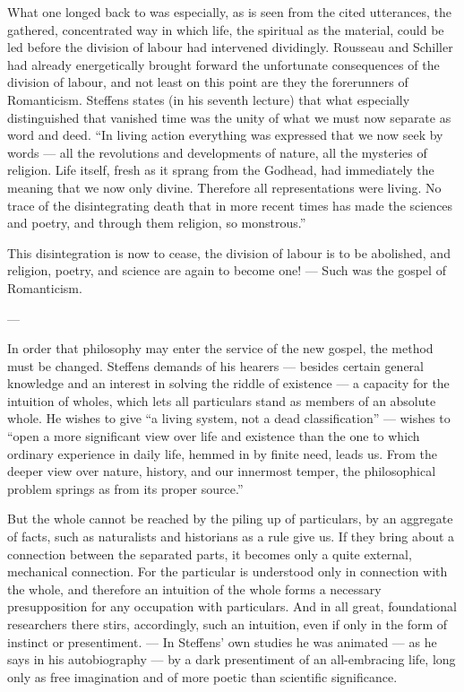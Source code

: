 \documentclass[12pt,a4paper]{book}
\newcommand{\opage}[1]{\marginnote{\footnotesize\textit{[#1]}}}
\begin{document}
What one longed back to was especially, as is seen from the cited utterances, the
gathered, concentrated way in which life, the spiritual as the material, could be
led before the division of labour had intervened dividingly. Rousseau and Schiller
had already energetically brought forward the unfortunate consequences of the
division of labour, and not least on this point are they the forerunners of
Romanticism. Steffens states (in his seventh lecture) that what especially
distinguished that vanished time was the unity of what we must now separate as word
and deed. ``In living action everything was expressed that we now seek by words ---
all the revolutions and developments of nature, all the mysteries of religion. Life
itself, fresh as it sprang from the Godhead, had immediately the meaning that we now
only divine. Therefore all representations were living. No trace of the
disintegrating death that in more recent times has made the sciences and poetry,
and through them religion, so monstrous.''

This disintegration is now to cease, the division of labour is to be abolished, and
religion, poetry, and science are again to become one! --- Such was the gospel of
Romanticism.

\begin{center}---\end{center}

\opage{44}In order that philosophy may enter the service of the new gospel, the method must be
changed. Steffens demands of his hearers --- besides certain general knowledge and
an interest in solving the riddle of existence --- a capacity for the intuition of
wholes, which lets all particulars stand as members of an absolute whole. He wishes
to give ``a living system, not a dead classification'' --- wishes to ``open a more
significant view over life and existence than the one to which ordinary experience
in daily life, hemmed in by finite need, leads us. From the deeper view over nature,
history, and our innermost temper, the philosophical problem springs as from its
proper source.''

But the whole cannot be reached by the piling up of particulars, by an aggregate of
facts, such as naturalists and historians as a rule give us. If they bring about a
connection between the separated parts, it becomes only a quite external, mechanical
connection. For the particular is understood only in connection with the whole, and
therefore an intuition of the whole forms a necessary presupposition for any
occupation with particulars. And in all great, foundational researchers there
stirs, accordingly, such an intuition, even if only in the form of instinct or
presentiment. --- In Steffens' own studies he was animated --- as he says in his
autobiography --- by a dark presentiment of an all-embracing life, long only as free
imagination and of more poetic than scientific significance.
\end{document}
